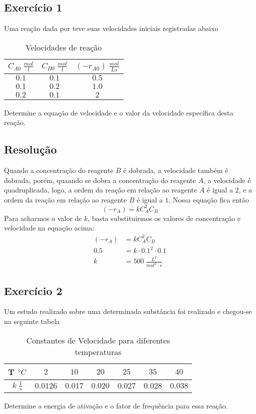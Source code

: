 \subsection{Exercício 1}
Uma reação dada por  teve suas velocidades iniciais registradas abaixo
\begin{table}[H]
\centering
\begin{tabular}{c|c|c}
\toprule
\(C_{A0} \; \frac{mol}{l}\)  & \(C_{B0} \;  \frac{mol}{l}\)  & \(\left( -r_{A0}  \right) \; \frac{mol}{Ls} \)    \\
 \midrule
 \(0.1\)  & \(0.1\)   &   \(0.5\) \\
 \(0.1\)  &  \(0.2\)  &  \(1.0\)  \\
 \(0.2\)  & \(0.1\)  & \(2\)   \\
\bottomrule
\end{tabular}
\caption{Velocidades de reação}
\label{tab:ex1_tabela_vel}
\end{table}
Determine a equação de velocidade e o valor da velocidade específica desta reação.
\subsection{Resolução}
Quando a concentração do reagente \(B\) é dobrada, a velocidade também é dobrada, porém, quaando se
dobra a concentração do reagente \(A\), a velocidade é quadruplicada, logo, a ordem da reação em 
relação ao reagente \(A\) é igual a \(2\), e a ordem da reação em relação ao reagente \(B\) é igual
a \(1\). Nossa equação fica então
\begin{equation}
    \left( -r_A \right) = k C_A^2 C_B
\end{equation}
Para acharmos o valor de \(k\), basta substituirmos os valores de concentração e velocidade na
equação acima:
\begin{align}
    \left( -r_A \right) &= k C_A^2 C_B \\
    0.5 &= k \cdot 0.1^2 \cdot 0.1 \\
    k &= 500 \; \frac{L^{2} }{mol^{2}  \cdot s}
\end{align}

\subsection{Exercício 2}
Um estudo realizado sobre uma determinada substância foi realizado e chegou-se na seguinte tabela
\begin{table}[H]
\centering
\begin{tabular}{c|c|c|c|c|c|c}
\toprule
T \(\degree C\)  & \(2\)  & \(10\)  &\(20\)   & \(25\)  & \(35\)  &  \(40\)  \\
 \midrule
\(k \; \frac{1}{s}\)   & \(0.0126\) & \(0.017\)   &\(0.020\)   &\(0.027\)   &\(0.028\)   &\(0.038\)    \\
\bottomrule
\end{tabular}
\caption{Constantes de Velocidade para diferentes temperaturas}
\label{tab:ex2_tabela_temp}
\end{table}
Determine a energia de ativação e o fator de frequência para essa reação.
